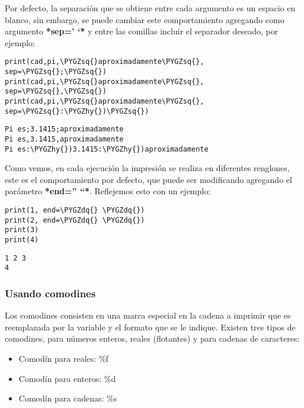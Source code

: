 \documentclass[a4paper,12pt,spanish]{sphinxmanual}
\def\PYGZhy{\char`\-}
\def\PYGZsq{\char`\'}
\def\PYGZdq{\char`\"}
\renewcommand\PYGZsq{\textquotesingle}
\begin{document}
Por defecto, la separación que se obtiene entre cada argumento es un
espacio en blanco, sin embargo, se puede cambiar este comportamiento
agregando como argumento \textbf{*sep=' `*} y entre las comillas incluir el
separador deseado, por ejemplo:

\begin{Verbatim}[commandchars=\\\{\}]
print(cad,pi,\PYGZsq{}aproximadamente\PYGZsq{}, sep=\PYGZsq{};\PYGZsq{})
print(cad,pi,\PYGZsq{}aproximadamente\PYGZsq{}, sep=\PYGZsq{},\PYGZsq{})
print(cad,pi,\PYGZsq{}aproximadamente\PYGZsq{}, sep=\PYGZsq{}:\PYGZhy{})\PYGZsq{})
\end{Verbatim}

\begin{Verbatim}[commandchars=\\\{\}]
Pi es;3.1415;aproximadamente
Pi es,3.1415,aproximadamente
Pi es:\PYGZhy{})3.1415:\PYGZhy{})aproximadamente
\end{Verbatim}

Como vemos, en cada ejecución la impresión se realiza en diferentes
renglones, este es el comportamiento por defecto, que puede ser
modificando agregando el parámetro \textbf{*end='' ``*}. Reflejemos esto con un
ejemplo:

\begin{Verbatim}[commandchars=\\\{\}]
print(1, end=\PYGZdq{} \PYGZdq{})
print(2, end=\PYGZdq{} \PYGZdq{})
print(3)
print(4)
\end{Verbatim}

\begin{Verbatim}[commandchars=\\\{\}]
1 2 3
4
\end{Verbatim}


\subsubsection{Usando comodines}
\label{Unidad01:usando-comodines}
Los comodines consisten en una marca especial en la cadena a imprimir
que es reemplazada por la variable y el formato que se le indique.
Existen tres tipos de comodines, para números enteros, reales
(flotantes) y para cadenas de caracteres:
\begin{itemize}
\item {} 
Comodín para reales: \%f

\item {} 
Comodín para enteros: \%d

\item {} 
Comodín para cadenas: \%s

\end{itemize}
\end{document}
